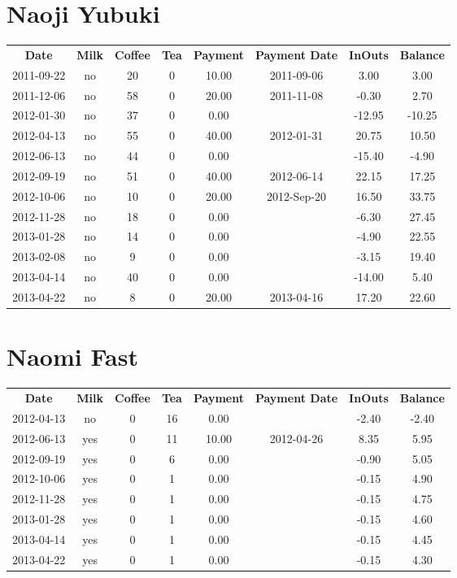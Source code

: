 \section{Naoji Yubuki}

\begin{center}
\begin{tabular}{cccccccc}
\textbf{Date} & \textbf{Milk} & \textbf{Coffee} & \textbf{Tea} & \textbf{Payment} & \textbf{Payment Date} & \textbf{InOuts} & \textbf{Balance} \\
2011-09-22 & no & 20 & 0 & 10.00 & 2011-09-06 &   3.00 &   3.00\\ 
2011-12-06 & no & 58 & 0 & 20.00 & 2011-11-08 &  -0.30 &   2.70\\ 
2012-01-30 & no & 37 & 0 &  0.00 &  & -12.95 & -10.25\\ 
2012-04-13 & no & 55 & 0 & 40.00 & 2012-01-31 &  20.75 &  10.50\\ 
2012-06-13 & no & 44 & 0 &  0.00 &  & -15.40 &  -4.90\\ 
2012-09-19 & no & 51 & 0 & 40.00 & 2012-06-14 &  22.15 &  17.25\\ 
2012-10-06 & no & 10 & 0 & 20.00 & 2012-Sep-20 &  16.50 &  33.75\\ 
2012-11-28 & no & 18 & 0 &  0.00 &  &  -6.30 &  27.45\\ 
2013-01-28 & no & 14 & 0 &  0.00 &  &  -4.90 &  22.55\\ 
2013-02-08 & no &  9 & 0 &  0.00 &  &  -3.15 &  19.40\\ 
2013-04-14 & no & 40 & 0 &  0.00 &  & -14.00 &   5.40\\ 
2013-04-22 & no &  8 & 0 & 20.00 & 2013-04-16 &  17.20 &  22.60
\end{tabular}
\end{center}

\section{Naomi Fast}

\begin{center}
\begin{tabular}{cccccccc}
\textbf{Date} & \textbf{Milk} & \textbf{Coffee} & \textbf{Tea} & \textbf{Payment} & \textbf{Payment Date} & \textbf{InOuts} & \textbf{Balance} \\
2012-04-13 & no & 0 & 16 &  0.00 &  & -2.40 & -2.40\\ 
2012-06-13 & yes & 0 & 11 & 10.00 & 2012-04-26 &  8.35 &  5.95\\ 
2012-09-19 & yes & 0 &  6 &  0.00 &  & -0.90 &  5.05\\ 
2012-10-06 & yes & 0 &  1 &  0.00 &  & -0.15 &  4.90\\ 
2012-11-28 & yes & 0 &  1 &  0.00 &  & -0.15 &  4.75\\ 
2013-01-28 & yes & 0 &  1 &  0.00 &  & -0.15 &  4.60\\ 
2013-04-14 & yes & 0 &  1 &  0.00 &  & -0.15 &  4.45\\ 
2013-04-22 & yes & 0 &  1 &  0.00 &  & -0.15 &  4.30
\end{tabular}
\end{center}

